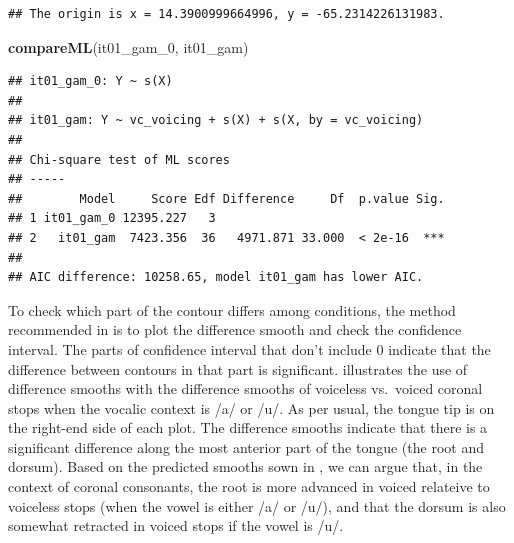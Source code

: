 \documentclass[12pt,]{article}
\newenvironment{Shaded}{\begin{snugshade}}{\end{snugshade}}
\newcommand{\DecValTok}[1]{\textcolor[rgb]{0.00,0.00,0.81}{#1}}
\newcommand{\KeywordTok}[1]{\textcolor[rgb]{0.13,0.29,0.53}{\textbf{#1}}}
\newcommand{\NormalTok}[1]{#1}
\begin{document}
\begin{verbatim}
## The origin is x = 14.3900999664996, y = -65.2314226131983.
\end{verbatim}

\begin{Shaded}
\begin{Highlighting}[]
\KeywordTok{compareML}\NormalTok{(it01_gam_}\DecValTok{0}\NormalTok{, it01_gam)}
\end{Highlighting}
\end{Shaded}

\begin{verbatim}
## it01_gam_0: Y ~ s(X)
## 
## it01_gam: Y ~ vc_voicing + s(X) + s(X, by = vc_voicing)
## 
## Chi-square test of ML scores
## -----
##        Model     Score Edf Difference     Df  p.value Sig.
## 1 it01_gam_0 12395.227   3                                
## 2   it01_gam  7423.356  36   4971.871 33.000  < 2e-16  ***
## 
## AIC difference: 10258.65, model it01_gam has lower AIC.
\end{verbatim}

To check which part of the contour differs among conditions, the method
recommended in \citet{soskuthy2017} is to plot the difference smooth and
check the confidence interval. The parts of confidence interval that
don't include 0 indicate that the difference between contours in that
part is significant.  illustrates the use of
difference smooths with the difference smooths of voiceless vs.~voiced
coronal stops when the vocalic context is /a/ or /u/. As per usual, the
tongue tip is on the right-end side of each plot. The difference smooths
indicate that there is a significant difference along the most anterior
part of the tongue (the root and dorsum). Based on the predicted smooths
sown in , we can argue that, in the context of
coronal consonants, the root is more advanced in voiced relateive to
voiceless stops (when the vowel is either /a/ or /u/), and that the
dorsum is also somewhat retracted in voiced stops if the vowel is /u/.
\end{document}
